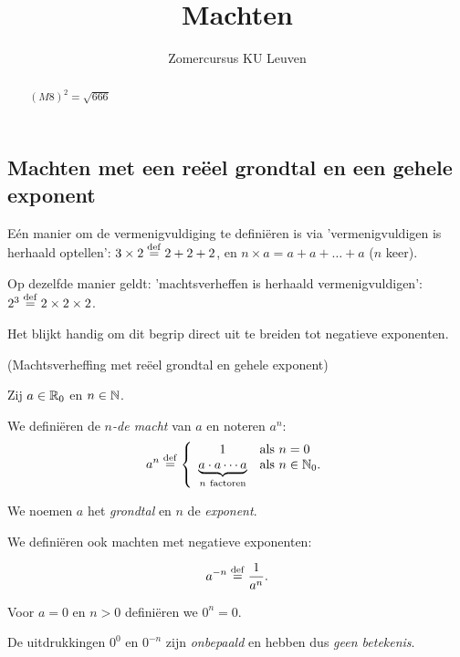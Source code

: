 \documentclass{ximera}
\author{Zomercursus KU Leuven}
\title[Rekenvaardigheden:]{Machten}
\begin{document}
\begin{abstract}
	$(M8)^2 = \sqrt{666}$
\end{abstract}
\maketitle

\subsection{Machten met een re\"eel grondtal en een gehele exponent}

Eén manier om de vermenigvuldiging te definiëren is via 'vermenigvuldigen is herhaald optellen': $3\times 2 \overset{\mathrm{def}}{=} 2 + 2+ 2$, en $n\times a = a+a+\dots +a$ ($n$ keer). 

Op dezelfde manier geldt: 'machtsverheffen is herhaald vermenigvuldigen': $2^3 \overset{\mathrm{def}}{=} 2\times2\times2$. 

Het blijkt handig om dit begrip direct uit te breiden tot negatieve exponenten. 

\begin{definition}(Machtsverheffing met re\"eel grondtal en gehele exponent) \ 
	
	Zij $a\in\mathbb{R}_0$ en $n\in\mathbb{N}$. 
	
	We definiëren de \emph{$n$-de macht}  van $a$ en noteren $a^n$:
	\[a^n\overset{\mathrm{def}}{=}
	\left\{
	\begin{array}{cl}
	1 & \textrm{als }n=0 \\
	\underbrace{a\cdot a\cdots a}_{n\mathrm{\ factoren}} & \textrm{als }n\in\mathbb{N}_0. \\
	\end{array}
	\right.\]
	
	We noemen $a$ het \textit{grondtal} en $n$ de \textit{exponent}.
		
	We definiëren ook machten met negatieve exponenten:
	
	\[a^{-n}\overset{\mathrm{def}}{=}\frac{1}{a^n}.\]
	
	Voor $a=0$ en $n>0$ definiëren we $0^n = 0$. 
	
	De uitdrukkingen $0^0$ en $0^{-n}$ zijn \textit{onbepaald} en hebben dus \textit{geen betekenis}.
	
\end{definition}

\end{document}
